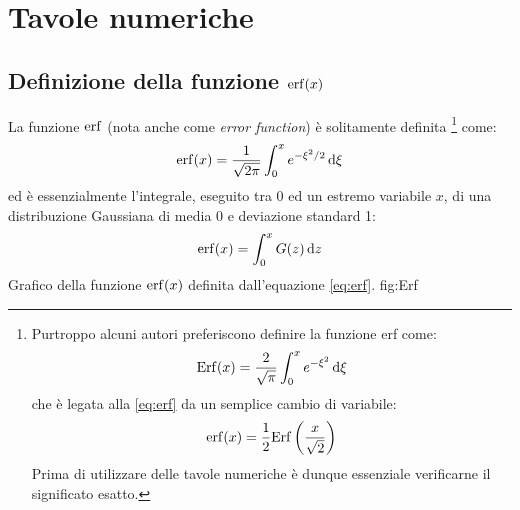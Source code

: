 \chapter{Tavole numeriche}
\label{chap:TavoleNumeriche}

\section{Definizione della funzione \texorpdfstring{$\erf(x)$}{erf}}
\label{app:Erf}

La funzione $\erf$ (nota anche come {\itshape error function}) \`e
solitamente definita%
\footnote
{
Purtroppo alcuni autori preferiscono definire la funzione erf come:
\begin{equation}\label{eq:Erf}
\Erf(x) = \frac{2}{\sqrt{\pi}} \dintegral{e^{-\xi^2}}{\xi}{0}{x}
\end{equation}
che \`e legata alla \ref{eq:erf} da un semplice cambio di variabile:
\begin{equation}
\erf(x) = \frac{1}{2} \Erf \left( \frac{x}{\sqrt{2}} \right)
\end{equation}
Prima di utilizzare delle tavole numeriche \`e dunque essenziale
verificarne il significato esatto.
}
come:
\begin{equation}\label{eq:erf}
\erf(x) = \frac{1}{\sqrt{2\pi}} \dintegral{e^{-\xi^2/2}}{\xi}{0}{x}
\end{equation}
ed \`e essenzialmente l'integrale, eseguito tra 0 ed un estremo
variabile $x$, di una distribuzione Gaussiana di media 0 e deviazione
standard 1:
\begin{equation}
\erf(x) = \dintegral{G(z)}{z}{0}{x}
\end{equation}
\panelfig
{}
{Grafico della funzione $\erf(x)$ definita dall'equazione \ref{eq:erf}.}
{fig:Erf}

\begin{exemplify}



\end{exemplify}


